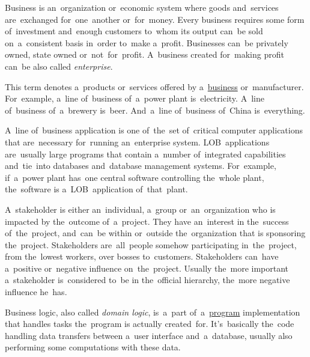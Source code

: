 \label{business}
Business is an~organization or~economic system where goods and~services are~exchanged for~one~another or~for~money.
Every business requires some form of~investment and~enough customers to~whom its output can~be sold on~a~consistent basis in~order to~make a~profit.
Businesses can~be privately owned, state owned or~not~for~profit.
A~business created for~making profit can~be also called \textit{enterprise}.

This term denotes a~products or~services offered by a~\hyperref[business]{business} or~manufacturer.
For~example, a~line of~business of~a~power plant is~electricity.
A~line of~business of~a~brewery is~beer.
And~a~line of~business of~China is~everything.

A~line of~business application is one of~the~set of~critical computer applications that are~necessary for~running an~enterprise system.
LOB~applications are~usually large programs that contain a~number of~integrated capabilities and~tie~into databases and~database management systems.
For~example, if~a~power plant has~one central software controlling the~whole plant, the~software is a~LOB~application of~that~plant.

A~stakeholder is either an~individual, a~group or~an~organization who is impacted by the~outcome of~a~project.
They have an~interest in the~success of~the~project, and~can~be within or~outside the~organization that is sponsoring the~project.
Stakeholders are~all~people somehow participating in~the~project, from the~lowest workers, over bosses to~customers.
Stakeholders can~have a~positive or~negative influence on~the~project.
Usually the~more important a~stakeholder is~considered to~be in the~official hierarchy, the~more negative influence he~has.
\newpage

\label{businesslogic}
Business logic, also called \textit{domain logic}, is~a~part of~a~\hyperref[applicationprocessprogramservicethread]{program} implementation that handles tasks the~program is actually created~for.
It's~basically the~code handling data transfers between a~user interface and~a~database, usually also performing some computations with these data.

